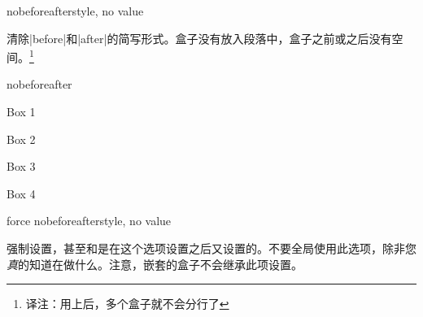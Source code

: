 \begin{docTcbKey}{nobeforeafter}{}{style, no value}

清除|before|和|after|的简写形式。盒子没有放入段落中，盒子之前或之后没有空间。\footnote{译注：用上后，多个盒子就不会分行了}
\begin{exdispExample}{nobeforeafter}
\begin{tcolorbox}[myone,title=Box 1]Box 1\end{tcolorbox}%
\begin{tcolorbox}[myone,title=Box 2]Box 2\end{tcolorbox}%
\begin{tcolorbox}[myone,title=Box 3]Box 3\end{tcolorbox}%
\begin{tcolorbox}[myone,title=Box 4]Box 4\end{tcolorbox}
\end{exdispExample}
\end{docTcbKey}



\begin{docTcbKey}{force nobeforeafter}{}{style, no value}

强制设置，甚至和是在这个选项设置之后又设置的。不要全局使用此选项，除非您\emph{真}的知道在做什么。注意，嵌套的盒子不会继承此项设置。
\end{docTcbKey}






